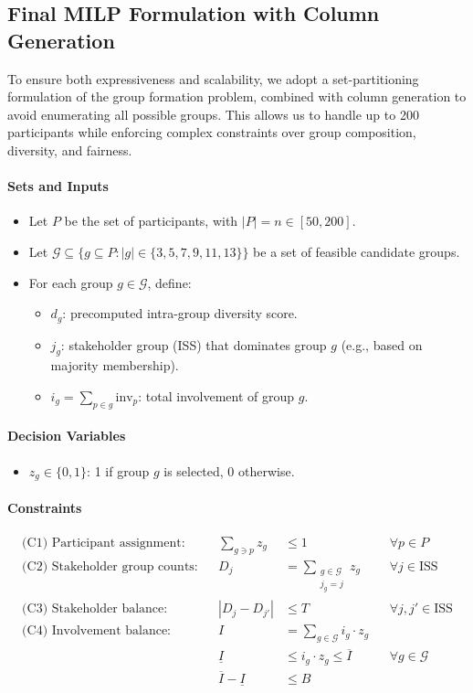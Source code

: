 \subsection*{Final MILP Formulation with Column Generation}

To ensure both expressiveness and scalability, we adopt a set-partitioning formulation of the group formation problem, combined with column generation to avoid enumerating all possible groups. This allows us to handle up to 200 participants while enforcing complex constraints over group composition, diversity, and fairness.

\paragraph{Sets and Inputs}
\begin{itemize}
    \item Let $P$ be the set of participants, with $|P| = n \in [50, 200]$.
    \item Let $\mathcal{G} \subseteq \{ g \subseteq P : |g| \in \{3,5,7,9,11,13\} \}$ be a set of feasible candidate groups.
    \item For each group $g \in \mathcal{G}$, define:
    \begin{itemize}
        \item $d_g$: precomputed intra-group diversity score.
        \item $j_g$: stakeholder group (ISS) that dominates group $g$ (e.g., based on majority membership).
        \item $i_g = \sum_{p \in g} \text{inv}_p$: total involvement of group $g$.
    \end{itemize}
\end{itemize}

\paragraph{Decision Variables}
\begin{itemize}
    \item $z_g \in \{0,1\}$: 1 if group $g$ is selected, 0 otherwise.
\end{itemize}

\paragraph{Constraints}
\begin{align*}
\text{(C1) Participant assignment:} && \sum_{g \ni p} z_g &\leq 1 && \forall p \in P \\
\text{(C2) Stakeholder group counts:} && D_j &= \sum_{\substack{g \in \mathcal{G} \\ j_g = j}} z_g && \forall j \in \text{ISS} \\
\text{(C3) Stakeholder balance:} && |D_j - D_{j'}| &\leq T && \forall j, j' \in \text{ISS} \\
\text{(C4) Involvement balance:} && I &= \sum_{g \in \mathcal{G}} i_g \cdot z_g \\
&& \underline{I} &\leq i_g \cdot z_g \leq \overline{I} && \forall g \in \mathcal{G} \\
&& \overline{I} - \underline{I} &\leq B
\end{align*}

